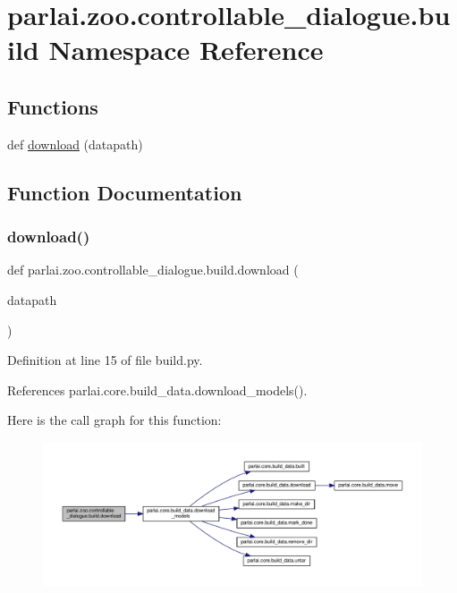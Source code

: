 \hypertarget{namespaceparlai_1_1zoo_1_1controllable__dialogue_1_1build}{}\section{parlai.\+zoo.\+controllable\+\_\+dialogue.\+build Namespace Reference}
\label{namespaceparlai_1_1zoo_1_1controllable__dialogue_1_1build}
\subsection*{Functions}
\begin{DoxyCompactItemize}
\item 
def \hyperlink{namespaceparlai_1_1zoo_1_1controllable__dialogue_1_1build_aa83ad8d48bada73bf7e1c6c5fa4a2f77}{download} (datapath)
\end{DoxyCompactItemize}


\subsection{Function Documentation}
\mbox{\label{namespaceparlai_1_1zoo_1_1controllable__dialogue_1_1build_aa83ad8d48bada73bf7e1c6c5fa4a2f77}} 
\subsubsection{\texorpdfstring{download()}{download()}}
{\footnotesize\ttfamily def parlai.\+zoo.\+controllable\+\_\+dialogue.\+build.\+download (\begin{DoxyParamCaption}\item[{}]{datapath }\end{DoxyParamCaption})}



Definition at line 15 of file build.\+py.



References parlai.\+core.\+build\+\_\+data.\+download\+\_\+models().

Here is the call graph for this function\+:
\nopagebreak
\begin{figure}[H]
\begin{center}
\leavevmode
\includegraphics[width=350pt]{namespaceparlai_1_1zoo_1_1controllable__dialogue_1_1build_aa83ad8d48bada73bf7e1c6c5fa4a2f77_cgraph}
\end{center}
\end{figure}
